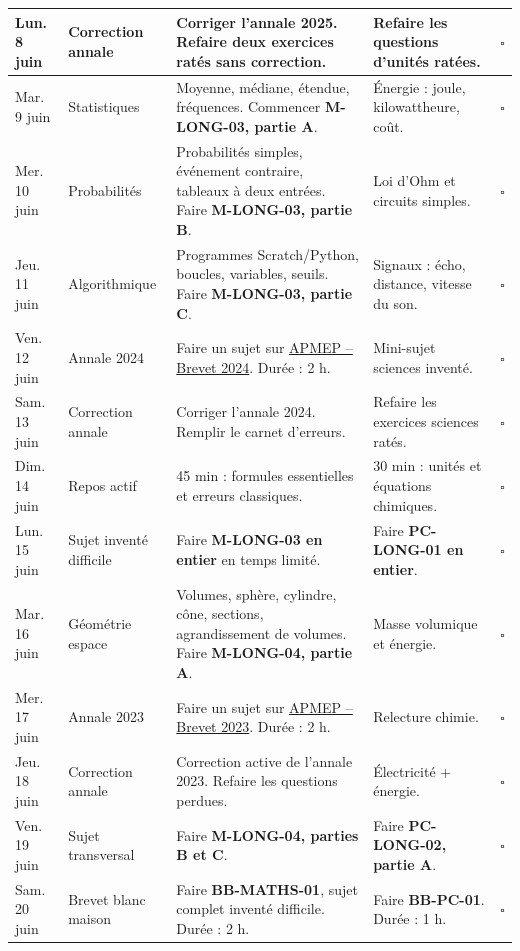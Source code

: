 \begin{longtable}{|p{2.3cm}|p{3.2cm}|p{4.7cm}|p{4.7cm}|p{0.7cm}|}
\hline
Lun. 8 juin & Correction annale & Corriger l'annale 2025. Refaire deux exercices ratés sans correction. & Refaire les questions d'unités ratées. & $\square$ \\
\hline
Mar. 9 juin & Statistiques & Moyenne, médiane, étendue, fréquences. Commencer \textbf{M-LONG-03, partie A}. & Énergie : joule, kilowattheure, coût. & $\square$ \\
\hline
Mer. 10 juin & Probabilités & Probabilités simples, événement contraire, tableaux à deux entrées. Faire \textbf{M-LONG-03, partie B}. & Loi d'Ohm et circuits simples. & $\square$ \\
\hline
Jeu. 11 juin & Algorithmique & Programmes Scratch/Python, boucles, variables, seuils. Faire \textbf{M-LONG-03, partie C}. & Signaux : écho, distance, vitesse du son. & $\square$ \\
\hline
Ven. 12 juin & Annale 2024 & Faire un sujet sur \href{https://www.apmep.fr/Brevet-2024}{APMEP -- Brevet 2024}. Durée : 2 h. & Mini-sujet sciences inventé. & $\square$ \\
\hline
Sam. 13 juin & Correction annale & Corriger l'annale 2024. Remplir le carnet d'erreurs. & Refaire les exercices sciences ratés. & $\square$ \\
\hline
Dim. 14 juin & Repos actif & 45 min : formules essentielles et erreurs classiques. & 30 min : unités et équations chimiques. & $\square$ \\
\hline
Lun. 15 juin & Sujet inventé difficile & Faire \textbf{M-LONG-03 en entier} en temps limité. & Faire \textbf{PC-LONG-01 en entier}. & $\square$ \\
\hline
Mar. 16 juin & Géométrie espace & Volumes, sphère, cylindre, cône, sections, agrandissement de volumes. Faire \textbf{M-LONG-04, partie A}. & Masse volumique et énergie. & $\square$ \\
\hline
Mer. 17 juin & Annale 2023 & Faire un sujet sur \href{https://www.apmep.fr/Brevet-2023}{APMEP -- Brevet 2023}. Durée : 2 h. & Relecture chimie. & $\square$ \\
\hline
Jeu. 18 juin & Correction annale & Correction active de l'annale 2023. Refaire les questions perdues. & Électricité + énergie. & $\square$ \\
\hline
Ven. 19 juin & Sujet transversal & Faire \textbf{M-LONG-04, parties B et C}. & Faire \textbf{PC-LONG-02, partie A}. & $\square$ \\
\hline
Sam. 20 juin & Brevet blanc maison & Faire \textbf{BB-MATHS-01}, sujet complet inventé difficile. Durée : 2 h. & Faire \textbf{BB-PC-01}. Durée : 1 h. & $\square$ \\

\end{longtable}
